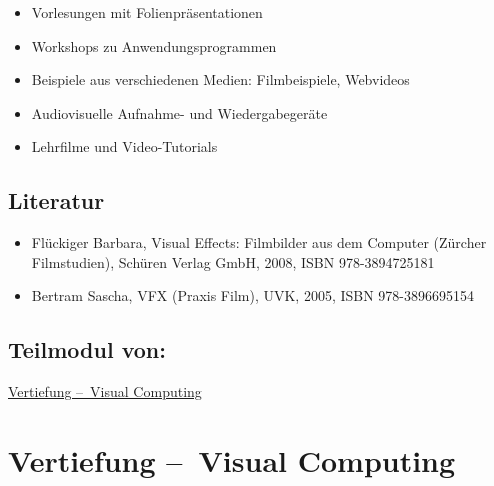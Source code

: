 \begin{itemize}
\tightlist
\item
  Vorlesungen mit Folienpräsentationen
\item
  Workshops zu Anwendungsprogrammen
\item
  Beispiele aus verschiedenen Medien: Filmbeispiele, Webvideos
\item
  Audiovisuelle Aufnahme- und Wiedergabegeräte
\item
  Lehrfilme und Video-Tutorials
\end{itemize}

\hypertarget{literaturpathlabelmi-2017modulbeschreibungen-bachelorba_vc-visuelle-effekte-und-animation}{%
\section*{Literatur\label{/mi-2017/modulbeschreibungen-bachelor/BA_VC-visuelle-effekte-und-animation}}\label{literaturpathlabelmi-2017modulbeschreibungen-bachelorba_vc-visuelle-effekte-und-animation}}

\begin{itemize}
\tightlist
\item
  Flückiger Barbara, Visual Effects: Filmbilder aus dem Computer
  (Zürcher Filmstudien), Schüren Verlag GmbH, 2008, ISBN 978-3894725181
\item
  Bertram Sascha, VFX (Praxis Film), UVK, 2005, ISBN 978-3896695154
\end{itemize}

\hypertarget{teilmodul-vonpathlabelmi-2017modulbeschreibungen-bachelorba_vc-visuelle-effekte-und-animation}{%
\section*{Teilmodul
von:\label{/mi-2017/modulbeschreibungen-bachelor/BA_VC-visuelle-effekte-und-animation}}\label{teilmodul-vonpathlabelmi-2017modulbeschreibungen-bachelorba_vc-visuelle-effekte-und-animation}}

\hyperref[/mi-2017/modulbeschreibungen-bachelor/BA_Vertiefung-Visual-Computing]{Vertiefung – Visual Computing}

\hypertarget{vertiefung-visual-computingpathlabelmi-2017modulbeschreibungen-bachelorba_vertiefung-visual-computing}{%
\chapter{Vertiefung --~Visual
Computing\label{/mi-2017/modulbeschreibungen-bachelor/BA_Vertiefung-Visual-Computing}}\label{vertiefung-visual-computingpathlabelmi-2017modulbeschreibungen-bachelorba_vertiefung-visual-computing}}

